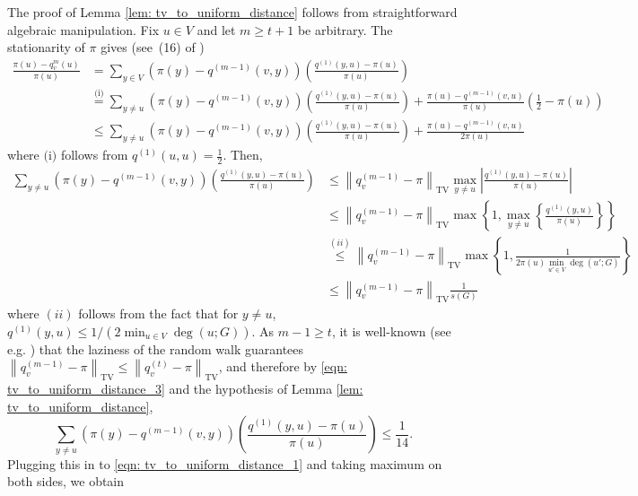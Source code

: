 \documentclass[11pt,twoside]{article}
\theoremstyle{definition}
\newcommand{\set}[1]{\left\{#1\right\}}
\newcommand{\abs}[1]{\left \lvert #1 \right \rvert}
\newcommand{\norm}[1]{\left\lVert#1\right\rVert}
\newcommand{\1}{\mathbbm{1}}
\begin{document}
The proof of Lemma \ref{lem: tv_to_uniform_distance} follows from straightforward algebraic manipulation. Fix $u \in V$ and let $m \geq t + 1$ be arbitrary. The stationarity of $\pi$ gives (see~(16) of \citep{morris2005})
\begin{align}
\frac{\pi(u) - q_v^{m}(u)}{\pi(u)} & = \sum_{y \in V} \left(\pi(y) - q^{(m-1)}(v,y)\right) \left(\frac{q^{(1)}(y,u) - \pi(u)}{\pi(u)}\right) \nonumber \\
& \overset{\text{(i)}}{=} \sum_{y \neq u} \left(\pi(y) - q^{(m-1)}(v,y)\right) \left(\frac{q^{(1)}(y,u) - \pi(u)}{\pi(u)}\right) + \frac{\pi(u) - q^{(m - 1)}(v,u)}{\pi(u)} \left(\frac{1}{2} - \pi(u)\right) \nonumber \\
& \leq \sum_{y \neq u} \left(\pi(y) - q^{(m-1)}(v,y)\right) \left(\frac{q^{(1)}(y,u) - \pi(u)}{\pi(u)}\right) + \frac{\pi(u) - q^{(m - 1)}(v,u)}{2 \pi(u)} \label{eqn: tv_to_uniform_distance_1}
\end{align}
where $\text{(i)}$ follows from $q^{(1)}(u,u) = \frac{1}{2}$. Then,
\begin{align}
\sum_{y \neq u} \left(\pi(y) - q^{(m-1)}(v,y)\right) \left(\frac{q^{(1)}(y,u) - \pi(u)}{\pi(u)}\right) & \leq \norm{q_v^{(m-1)} - \pi}_{\mathrm{TV}} \max_{y \neq u} \abs{\frac{q^{(1)}(y,u) - \pi(u)}{\pi(u)}} \nonumber \\
& \leq \norm{q_v^{(m-1)} - \pi}_{\mathrm{TV}} \max \set{1, \max_{y \neq u}\set{\frac{q^{(1)}(y,u)}{\pi(u)}}} \nonumber \\
& \overset{(ii)}{\leq} \norm{q_v^{(m-1)} - \pi}_{\mathrm{TV}} \max \set{1, \frac{1}{2 \pi(u) \min_{u' \in V} \deg(u';G) }} \nonumber \\
& \leq \norm{q_v^{(m-1)} - \pi}_{\mathrm{TV}} \frac{1}{s(G)} \label{eqn: tv_to_uniform_distance_3}
\end{align}
where $(ii)$ follows from the fact that for $y \neq u$, $q^{(1)}(y,u) \leq 1/\left(2 \min_{u \in V} \deg(u; G)\right)$. As $m - 1 \geq t$, it is well-known (see e.g. \cite{lovasz1990}) that the laziness of the random walk guarantees $\norm{q_v^{(m - 1)} - \pi}_{\mathrm{TV}} \leq \norm{q_v^{(t)} - \pi}_{\mathrm{TV}}$, and therefore by \eqref{eqn: tv_to_uniform_distance_3} and the hypothesis of Lemma \ref{lem: tv_to_uniform_distance},
\begin{equation*}
\sum_{y \neq u} \left(\pi(y) - q^{(m-1)}(v,y)\right) \left(\frac{q^{(1)}(y,u) - \pi(u)}{\pi(u)}\right) \leq \frac{1}{14}.
\end{equation*}
Plugging this in to \eqref{eqn: tv_to_uniform_distance_1} and taking maximum on both sides, we obtain
\end{document}
